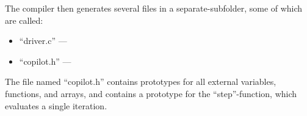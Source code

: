 The compiler then generates several files in a separate-subfolder, some of which are called:

\begin{itemize}
\item ``driver.c'' ---
\item ``copilot.h'' ---
\end{itemize}

The file named ``copilot.h'' contains prototypes for all external variables,
functions, and arrays, and contains a prototype for the ``step''-function,
which evaluates a single iteration.




